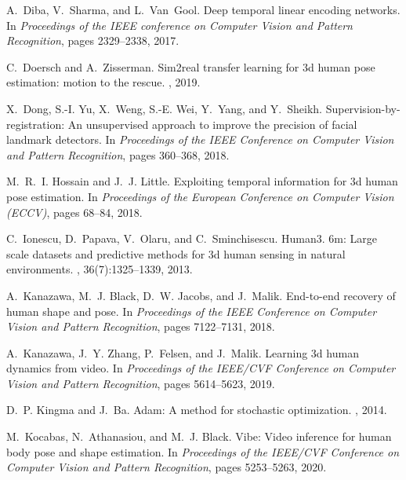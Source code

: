 \documentclass[10pt,twocolumn,letterpaper]{article}
\begin{document}
\begin{thebibliography}{10}
A.~Diba, V.~Sharma, and L.~Van~Gool.
\newblock Deep temporal linear encoding networks.
\newblock In {\em Proceedings of the IEEE conference on Computer Vision and
  Pattern Recognition}, pages 2329--2338, 2017.

C.~Doersch and A.~Zisserman.
\newblock Sim2real transfer learning for 3d human pose estimation: motion to
  the rescue.
, 2019.

X.~Dong, S.-I. Yu, X.~Weng, S.-E. Wei, Y.~Yang, and Y.~Sheikh.
\newblock Supervision-by-registration: An unsupervised approach to improve the
  precision of facial landmark detectors.
\newblock In {\em Proceedings of the IEEE Conference on Computer Vision and
  Pattern Recognition}, pages 360--368, 2018.

M.~R.~I. Hossain and J.~J. Little.
\newblock Exploiting temporal information for 3d human pose estimation.
\newblock In {\em Proceedings of the European Conference on Computer Vision
  (ECCV)}, pages 68--84, 2018.

C.~Ionescu, D.~Papava, V.~Olaru, and C.~Sminchisescu.
\newblock Human3. 6m: Large scale datasets and predictive methods for 3d human
  sensing in natural environments.
,
  36(7):1325--1339, 2013.

A.~Kanazawa, M.~J. Black, D.~W. Jacobs, and J.~Malik.
\newblock End-to-end recovery of human shape and pose.
\newblock In {\em Proceedings of the IEEE Conference on Computer Vision and
  Pattern Recognition}, pages 7122--7131, 2018.

A.~Kanazawa, J.~Y. Zhang, P.~Felsen, and J.~Malik.
\newblock Learning 3d human dynamics from video.
\newblock In {\em Proceedings of the IEEE/CVF Conference on Computer Vision and
  Pattern Recognition}, pages 5614--5623, 2019.

D.~P. Kingma and J.~Ba.
\newblock Adam: A method for stochastic optimization.
, 2014.

M.~Kocabas, N.~Athanasiou, and M.~J. Black.
\newblock Vibe: Video inference for human body pose and shape estimation.
\newblock In {\em Proceedings of the IEEE/CVF Conference on Computer Vision and
  Pattern Recognition}, pages 5253--5263, 2020.


\end{thebibliography}
\end{document}
